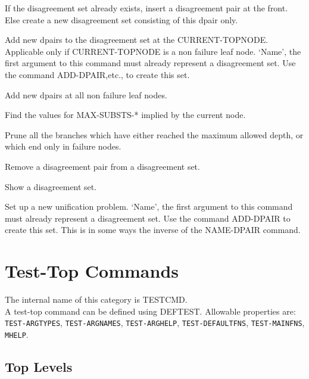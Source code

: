 \begin{description} 
\item[ADD-DPAIR]  
If the disagreement set already exists, insert a disagreement pair at
the front. Else create a new disagreement set consisting of this dpair only.

\item[ADD-DPAIRS-TO-NODE]  
Add new dpairs to the disagreement set at the CURRENT-TOPNODE. Applicable 
only if CURRENT-TOPNODE is a non failure leaf node. `Name', the first argument 
to this command must already represent a disagreement set. Use the command 
ADD-DPAIR,etc., to create this set.

\item[ADD-DPAIRS-TO-UTREE]  
Add new dpairs at all non failure leaf nodes.

\item[FIND-NESTING]  
Find the values for MAX-SUBSTS-* implied by
the current node.

\item[PRUNE]  
Prune all the branches which have either reached the maximum
allowed depth, or which end only in failure nodes.

\item[RM-DPAIR]  
Remove a disagreement pair from a disagreement set.

\item[SHOW-DPAIRSET]  
Show a disagreement set.

\item[UNIF-PROBLEM]  
Set up a new unification problem. `Name', the first argument to this 
command must already represent a disagreement set. Use the command ADD-DPAIR
to create this set. This is in some ways the inverse of the NAME-DPAIR 
command.
\item
\end{description}
\chapter{Test-Top Commands}
The internal name of this category is 
TESTCMD.\\
A test-top command can be defined using DEFTEST.
Allowable properties are: \texttt{TEST-ARGTYPES}, \texttt{TEST-ARGNAMES}, \texttt{TEST-ARGHELP}, \texttt{TEST-DEFAULTFNS}, \texttt{TEST-MAINFNS}, \texttt{MHELP}.

\section{Top Levels}

